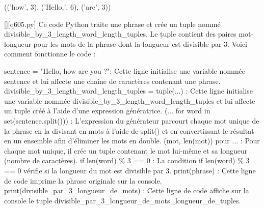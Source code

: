 (('how', 3), ('Hello,', 6), ('are', 3))
        \par
        \begin{solution}
            \renewcommand{\nomfichier}{q605.py}
            \pythonfile{\chemincode \nomfichier}[][\nomfichier]
            Ce code Python traite une phrase et crée un tuple nommé divisible\_by\_3\_length\_word\_length\_tuples. Le tuple contient des paires mot-longueur pour les mots de la phrase dont la longueur est divisible par 3. Voici comment fonctionne le code :

    sentence = "Hello, how are you ?": Cette ligne initialise une variable nommée sentence et lui affecte une chaîne de caractères contenant une phrase.
    divisible\_by\_3\_length\_word\_length\_tuples = tuple(...) : Cette ligne initialise une variable nommée divisible\_by\_3\_length\_word\_length\_tuples et lui affecte un tuple créé à l'aide d'une expression génératrice.
        (... for word in set(sentence.split())) : L'expression du générateur parcourt chaque mot unique de la phrase en la divisant en mots à l'aide de split() et en convertissant le résultat en un ensemble afin d'éliminer les mots en double.
        (mot, len(mot)) pour ... : Pour chaque mot unique, il crée un tuple contenant le mot lui-même et sa longueur (nombre de caractères).
        if len(word) \% 3 == 0 : La condition if len(word) \% 3 == 0 vérifie si la longueur du mot est divisible par 3.
    print(phrase) : Cette ligne de code imprime la phrase originale sur la console.
    print(divisible\_par\_3\_longueur\_de\_mots) : Cette ligne de code affiche sur la console le tuple divisible\_par\_3\_longueur\_de\_mots\_longueur\_de\_tuples.
        \end{solution}
        